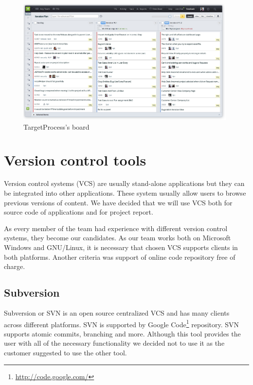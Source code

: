 \begin{figure}[!t]
	\centering
		\includegraphics[width=11cm]{preliminaryStudies/targetp.png}
	\caption{TargetProcess's board}
	\label{img:targetp}
\end{figure}


\section{Version control tools}
Version control systems (VCS) are usually stand-alone applications but they can be integrated into other applications. These system usually allow users to browse previous versions of content. We have decided that we will use VCS both for source code of applications and for project report. 

As every member of the team had experience with different version control systems, they become our candidates. As our team works both on Microsoft Windows and GNU/Linux, it is necessary that chosen VCS supports clients in both platforms. Another criteria was support of online code repository free of charge.


\subsection{Subversion}
Subversion or SVN is an open source centralized VCS and has many clients across different platforms. 
SVN is supported by Google Code\footnote{\url{http://code.google.com/}} repository.
SVN supports atomic commits, branching and more. Although this tool provides the user with all of the necessary functionality we decided not to use it as the customer suggested to use the other tool.

